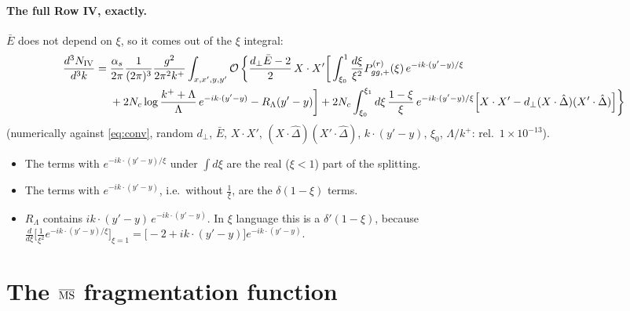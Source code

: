 \documentclass[10pt]{article}
\numberwithin{equation}{section}
\newcommand{\Dh}{\hat\Delta}
\newcommand{\OO}{\mathcal O}
\newcommand{\pre}{\frac{1}{(2\pi)^3}\frac{g^2}{2\pi^2k^+}}
\begin{document}
\paragraph{The full Row IV, exactly.} $\bar E$ does not depend on $\xi$, so it comes out of the $\xi$ integral:
\begin{align}
\frac{d^3N_{\rm IV}}{d^3k}={}&\frac{\alpha_s}{2\pi}\pre\int_{x,x',y,y'}\OO\,\bigg\{\frac{d_\perp\bar E-2}{2}\,X\cdot X'\bigg[\int_{\xi_0}^1\frac{d\xi}{\xi^2}P^{(r)}_{gg,+}(\xi)\,e^{-ik\cdot(y'-y)/\xi}\notag\\
&+2N_c\log\frac{k^++\Lambda}{\Lambda}\,e^{-ik\cdot(y'-y)}-R_\Lambda(y'-y)\bigg]+2N_c\int_{\xi_0}^{\xi_1}d\xi\,\frac{1-\xi}{\xi}\,e^{-ik\cdot(y'-y)/\xi}\Big[X\cdot X'-d_\perp(X\cdot\Dh)(X'\cdot\Dh)\Big]\bigg\}
\label{eq:full}
\end{align}
(numerically against \eqref{eq:conv}, random $d_\perp$, $\bar E$, $X\cdot X'$, $(X\cdot\Dh)(X'\cdot\Dh)$, $k\cdot(y'-y)$, $\xi_0$, $\Lambda/k^+$: rel.\ $1\times10^{-13}$).
\begin{itemize}
\item The terms with $e^{-ik\cdot(y'-y)/\xi}$ under $\int d\xi$ are the real ($\xi<1$) part of the splitting.
\item The terms with $e^{-ik\cdot(y'-y)}$, i.e.\ without $\frac1\xi$, are the $\delta(1-\xi)$ terms.
\item $R_\Lambda$ contains $ik\cdot(y'-y)\,e^{-ik\cdot(y'-y)}$. In $\xi$ language this is a $\delta'(1-\xi)$, because $\frac{d}{d\xi}\big[\frac{1}{\xi^2}e^{-ik\cdot(y'-y)/\xi}\big]_{\xi=1}=\big[-2+ik\cdot(y'-y)\big]e^{-ik\cdot(y'-y)}$.
\end{itemize}

\section{The \texorpdfstring{$\overline{\rm MS}$}{MS-bar} fragmentation function}\label{sec:FF}
\end{document}
